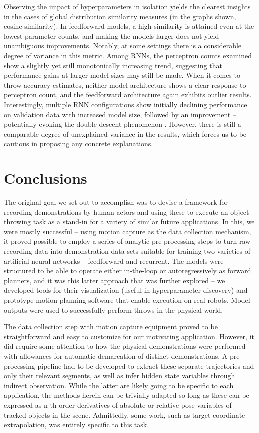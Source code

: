 \documentclass{article}
\begin{document}
Observing the impact of hyperparameters in isolation yields the clearest insights in the cases of global distribution similarity measures (in the graphs shown, cosine similarity). In feedforward models, a high similarity is attained even at the lowest parameter counts, and making the models larger does not yield unambiguous improvements. Notably, at some settings there is a considerable degree of variance in this metric. Among RNNs, the perceptron counts examined show a slightly yet still monotonically increasing trend, suggesting that performance gains at larger model sizes may still be made. When it comes to throw accuracy estimates, neither model architecture shows a clear response to perceptron count, and the feedforward architecture again exhibits outlier results. Interestingly, multiple RNN configurations show initially declining performance on validation data with increased model size, followed by an improvement -- potentially evoking the double descent phenomenon \citep{nakkiran2021deep}. However, there is still a comparable degree of unexplained variance in the results, which forces us to be cautious in proposing any concrete explanations.

\section{Conclusions}

The original goal we set out to accomplish was to devise a framework for recording demonstrations by human actors and using these to execute an object throwing task as a stand-in for a variety of similar future applications. In this, we were mostly successful -- using motion capture as the data collection mechanism, it proved possible to employ a series of analytic pre-processing steps to turn raw recording data into demonstration data sets suitable for training two varieties of artificial neural networks -- feedforward and recurrent. The models were structured to be able to operate either in-the-loop or autoregressively as forward planners, and it was this latter approach that was further explored -- we developed tools for their visualization (useful in hyperparameter discovery) and prototype motion planning software that enable execution on real robots. Model outputs were used to successfully perform throws in the physical world.

The data collection step with motion capture equipment proved to be straightforward and easy to customize for our motivating application. However, it did require some attention to how the physical demonstrations were performed -- with allowances for automatic demarcation of distinct demonstrations. A pre-processing pipeline had to be developed to extract these separate trajectories and only their relevant segments, as well as infer hidden state variables through indirect observation. While the latter are likely going to be specific to each application, the methods herein can be trivially adapted so long as these can be expressed as n-th order derivatives of absolute or relative pose variables of tracked objects in the scene. Admittedly, some work, such as target coordinate extrapolation, was entirely specific to this task. 
\end{document}
